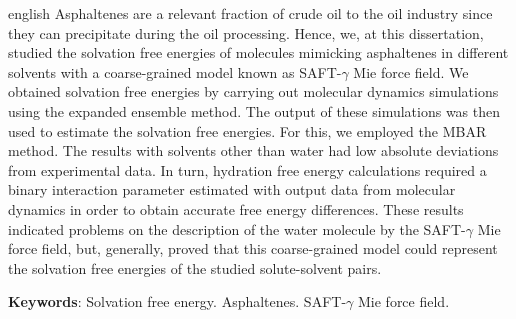 \documentclass[
	12pt,				%
	openany,			%
	oneside,			%
	a4paper,			%
	english,			%
	brazil				%
	]{abntex2}
\begin{document}
\setlength{\absparsep}{18pt} %
%
\begin{resumo}[Abstract]
 \begin{otherlanguage*}{english}
   Asphaltenes are a  relevant fraction of crude oil to the oil industry since they can precipitate during the oil processing. Hence, we, at this dissertation, studied the solvation free energies of molecules mimicking asphaltenes in different solvents with a coarse-grained model known as SAFT-$\gamma$ Mie force field. We obtained solvation free energies  by carrying out molecular dynamics simulations using the expanded ensemble method. The output of these simulations was then used to estimate the solvation free energies. For this, we employed the MBAR method. The results with solvents other than water had low absolute deviations from experimental data. In turn, hydration free energy calculations required a binary interaction parameter estimated with output data from molecular dynamics in order to obtain accurate free energy differences. These results indicated problems on the description of the water molecule by the SAFT-$\gamma$ Mie force field, but, generally, proved that this coarse-grained model could represent the solvation free energies of the studied solute-solvent pairs.

   \vspace{\onelineskip}

   \noindent 
   \textbf{Keywords}: Solvation free energy. Asphaltenes. SAFT-$\gamma$ Mie force field.
 \end{otherlanguage*}
\end{resumo}

\listoffigures*
\cleardoublepage
\end{document}
